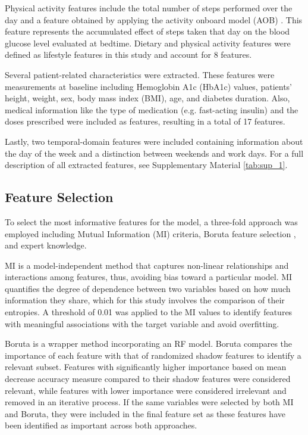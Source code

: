 Physical activity features include the total number of steps performed over the day and a feature obtained by applying the activity onboard model (AOB) \cite{oviedo2019minimizing}. This feature represents the accumulated effect of steps taken that day on the blood glucose level evaluated at bedtime. Dietary and physical activity features were defined as lifestyle features in this study and account for 8 features.

Several patient-related characteristics were extracted. These features were measurements at baseline including Hemoglobin A1c (HbA1c) values, patients' height, weight, sex, body mass index (BMI), age, and diabetes duration. Also, medical information like the type of medication (e.g. fast-acting insulin) and the doses prescribed were included as features, resulting in a total of 17 features.

Lastly, two temporal-domain features were included containing information about the day of the week and a distinction between weekends and work days. For a full description of all extracted features, see Supplementary Material \ref{tab:sup_1}.

\subsection{Feature Selection} \label{Feature Selection}
To select the most informative features for the model, a three-fold approach was employed including Mutual Information (MI) \cite{meyer2008information} criteria, Boruta feature selection \cite{kursa2010feature}, and expert knowledge.

MI is a model-independent method that captures non-linear relationships and interactions among features, thus, avoiding bias toward a particular model. MI quantifies the degree of dependence between two variables based on how much information they share, which for this study involves the comparison of their entropies. A threshold of 0.01 was applied to the MI values to identify features with meaningful associations with the target variable and avoid overfitting.

Boruta is a wrapper method incorporating an RF model. Boruta compares the importance of each feature with that of randomized shadow features to identify a relevant subset. Features with significantly higher importance based on mean decrease accuracy measure compared to their shadow features were considered relevant, while features with lower importance were considered irrelevant and removed in an iterative process. If the same variables were selected by both MI and Boruta, they were included in the final feature set as these features have been identified as important across both approaches.


